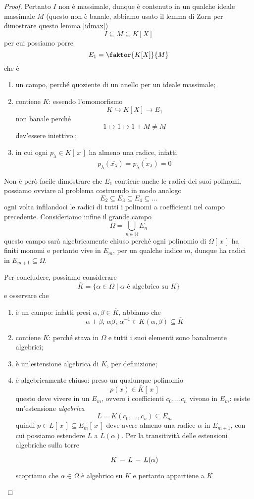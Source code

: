\begin{multicols}{2}
\begin{proof}
	Pertanto $ I $ non è massimale, dunque è contenuto in un qualche ideale massimale $ M $ (questo non è banale, abbiamo usato il lemma di Zorn per dimostrare questo lemma \ref{idmax})
	\[ I \subseteq M \subseteq K[X] \]
	per cui possiamo porre
	\[ E_1 = \faktor{K[X]}{M} \]
	che è
	\begin{enumerate}
		\item un campo, perché quoziente di un anello per un ideale massimale;
		\item contiene $ K $: essendo l'omomorfismo
		\[ K \hookrightarrow K[X] \to E_1 \]
		non banale perché
		\[ 1 \mapsto 1 \mapsto 1 + M \neq M \]
		dev'essere iniettivo.;
		\item in cui ogni $ p_\lambda \in K[\,x\,] $ ha almeno una radice, infatti
		\[ p_\lambda(\overline{x_\lambda}) = \overline{p_\lambda(x_\lambda)} = 0 \]
	\end{enumerate}
	
	Non è però facile dimostrare che $ E_1 $ contiene anche le radici dei suoi polinomi, possiamo ovviare al problema costruendo in modo analogo $$  E_2 \subseteq E_3 \subseteq E_4 \subseteq \dots  $$
	ogni volta infilandoci le radici di tutti i polinomi a coefficienti nel campo precedente. Consideriamo infine il grande campo
	\[ \Omega = \bigcup_{n \in \mathbb{N}} E_n \]
	questo campo sarà algebricamente chiuso perché ogni polinomio di $ \Omega[\,x\,] $ ha finiti monomi e pertanto vive in $ E_{m} $, per un qualche indice $ m $, dunque ha radici in $ E_{m+1} \subseteq \Omega $.
	
	Per concludere, possiamo considerare 
	\[ \overline{K} = \{ \alpha \in \Omega \mid \alpha \text{ è algebrico su } K \} \]
	e osservare che
	\begin{enumerate}
		\item è un campo: infatti presi $ \alpha, \beta \in \overline{K} $, abbiamo che
		\[ \alpha + \beta,\, \alpha\beta, \, \alpha^{-1} \in K(\alpha, \beta) \subseteq \overline{K} \]
		\item contiene $ K $: perché stava in $ \Omega $ e tutti i suoi elementi sono banalmente algebrici;
		\item è un'estensione algebrica di $ K $, per definizione;
		\item è algebricamente chiuso: preso un qualunque polinomio
		\[ p(x) \in \overline{K}[\, x \,] \]
		questo deve vivere in un $ E_m $, ovvero i coefficienti $ c_0, \dots c_n $ vivono in $ E_m $: esiste un'estensione \emph{algebrica}
		\[ L = K(c_0, \dots, c_n) \subseteq E_m  \]
		quindi $ p \in L[\,x\,] \subseteq E_m[\,x\,]  $ deve avere almeno una radice $ \alpha $ in $ E_{m+1} $, con cui possiamo estendere $ L $ a $ L(\alpha) $. Per la transitività delle estensioni algebriche sulla torre
		\[\begin{tikzcd}[column sep=0.25cm]
		K \arrow [r,-] &
		L \arrow [r,-] &
		L(\alpha)
		\end{tikzcd} \]
		scopriamo che $ \alpha \in \Omega $ è algebrico su $ K $ e pertanto appartiene a $ \overline{K} $
		

\end{enumerate}
\end{proof}
\end{multicols}
